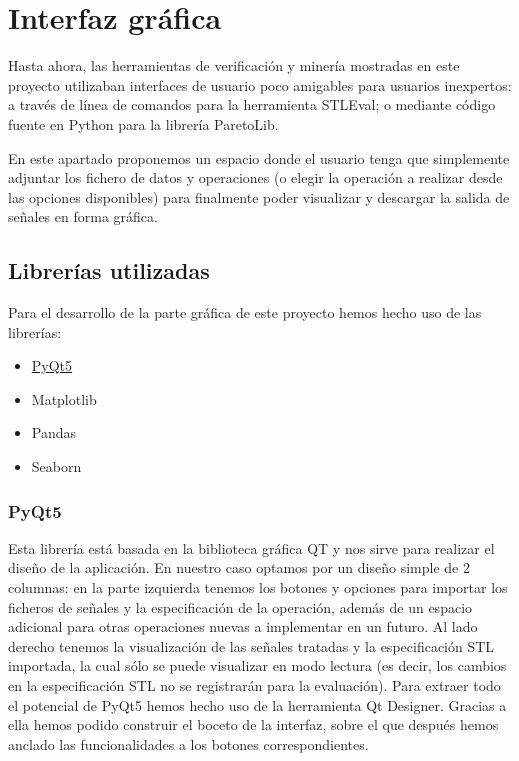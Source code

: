 \chapter{Interfaz gráfica}
\label{cha:gui}
 
Hasta ahora, las herramientas de verificación y minería mostradas en este proyecto utilizaban interfaces de usuario poco amigables para usuarios inexpertos: a través de línea de comandos para la herramienta STLEval; o mediante código fuente en Python para la librería ParetoLib.

En este apartado proponemos un espacio donde el usuario tenga que simplemente adjuntar los fichero de datos y operaciones (o elegir la operación a realizar desde las opciones disponibles) para finalmente poder visualizar y descargar la salida de señales en forma gráfica.
 
\section{Librerías utilizadas}

Para el desarrollo de la parte gráfica de este proyecto hemos hecho uso de las librerías:
\begin{itemize}
\item \href{https://www.qt.io/qt-for-python}{PyQt5}
\item Matplotlib
\item Pandas
\item Seaborn
\end{itemize}
 
\subsection{PyQt5}
Esta librería está basada en la biblioteca gráfica QT y nos sirve para realizar el diseño de la aplicación. En nuestro caso optamos por un diseño simple de 2 columnas: en la parte izquierda tenemos los botones y opciones para importar los ficheros de señales y la especificación de la operación, además de un espacio adicional para otras operaciones nuevas a implementar en un futuro. Al lado derecho tenemos la visualización de las señales tratadas y la especificación STL importada, la cual sólo se puede visualizar en modo lectura (es decir, los cambios en la especificación STL no se registrarán para la evaluación). Para extraer todo el potencial de PyQt5 hemos hecho uso de la herramienta Qt Designer. Gracias a ella hemos podido construir el boceto de la interfaz, sobre el que después hemos anclado las funcionalidades a los botones correspondientes.

